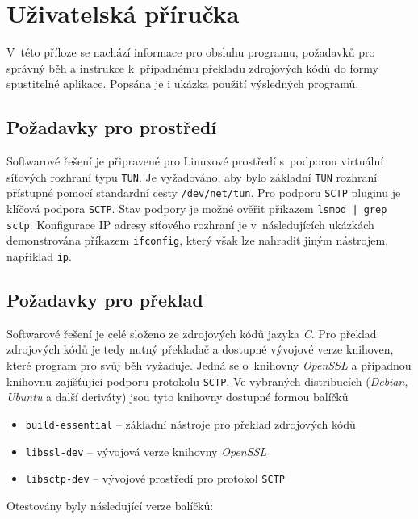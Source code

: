 \documentclass[thesis=M,czech]{FITthesis}[2012/10/20]
\begin{document}
\appendix

\chapter{Uživatelská příručka}

V~této příloze se nachází informace pro obsluhu programu, požadavků pro správný běh a instrukce k~případnému překladu zdrojových kódů do formy spustitelné aplikace. Popsána je i ukázka použití výsledných programů.

\section{Požadavky pro prostředí}

Softwarové řešení je připravené pro Linuxové prostředí s~podporou virtuální síťových rozhraní typu \texttt{TUN}. Je vyžadováno, aby bylo základní \texttt{TUN} rozhraní přístupné pomocí standardní cesty \texttt{/dev/net/tun}. Pro podporu \texttt{SCTP} pluginu je klíčová podpora \texttt{SCTP}. Stav podpory je možné ověřit příkazem \verb=lsmod | grep sctp=. Konfigurace IP adresy síťového rozhraní je v~následujících ukázkách demonstrována příkazem \texttt{ifconfig}, který však lze nahradit jiným nástrojem, například \texttt{ip}.

\section{Požadavky pro překlad}

Softwarové řešení je celé složeno ze zdrojových kódů jazyka \textit{C}. Pro překlad zdrojových kódů je tedy nutný překladač a dostupné vývojové verze knihoven, které program pro svůj běh vyžaduje. Jedná se o~knihovny \textit{OpenSSL} a případnou knihovnu zajišťující podporu protokolu \texttt{SCTP}. Ve vybraných distribucích (\textit{Debian}, \textit{Ubuntu} a další deriváty) jsou tyto knihovny dostupné formou balíčků

\begin{itemize}
 \item \texttt{build-essential} -- základní nástroje pro překlad zdrojových kódů
 \item \texttt{libssl-dev} -- vývojová verze knihovny \textit{OpenSSL}
 \item \texttt{libsctp-dev} -- vývojové prostředí pro protokol \texttt{SCTP}
\end{itemize}

Otestovány byly následující verze balíčků:
\end{document}
